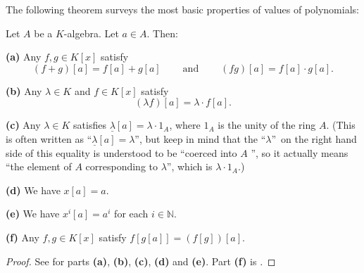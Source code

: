 The following theorem surveys the most basic properties of values of polynomials:

\begin{theorem}
\label{thm.pol.eval.a+b}Let $A$ be a $K$-algebra. Let $a\in A$. Then: \medskip

\textbf{(a)} Any $f,g\in K\left[  x\right]  $ satisfy%
\[
\left(  f+g\right)  \left[  a\right]  =f\left[  a\right]  +g\left[  a\right]
\ \ \ \ \ \ \ \ \ \ \text{and}\ \ \ \ \ \ \ \ \ \ \left(  fg\right)  \left[
a\right]  =f\left[  a\right]  \cdot g\left[  a\right]  .
\]


\textbf{(b)} Any $\lambda\in K$ and $f\in K\left[  x\right]  $ satisfy%
\[
\left(  \lambda f\right)  \left[  a\right]  =\lambda\cdot f\left[  a\right]
.
\]


\textbf{(c)} Any $\lambda\in K$ satisfies $\underline{\lambda}\left[
a\right]  =\lambda\cdot1_{A}$, where $1_{A}$ is the unity of the ring $A$.
(This is often written as \textquotedblleft$\underline{\lambda}\left[
a\right]  =\lambda$\textquotedblright, but keep in mind that the
\textquotedblleft$\lambda$\textquotedblright\ on the right hand side of this
equality is understood to be \textquotedblleft coerced into $A$%
\textquotedblright, so it actually means \textquotedblleft the element of $A$
corresponding to $\lambda$\textquotedblright, which is $\lambda\cdot1_{A}$.)
\medskip

\textbf{(d)} We have $x\left[  a\right]  =a$. \medskip

\textbf{(e)} We have $x^{i}\left[  a\right]  =a^{i}$ for each $i\in\mathbb{N}%
$. \medskip

\textbf{(f)} Any $f,g\in K\left[  x\right]  $ satisfy $f\left[  g\left[
a\right]  \right]  =\left(  f\left[  g\right]  \right)  \left[  a\right]  $.
\end{theorem}

\begin{proof}
See \cite[Theorem 7.6.3]{19s} for parts \textbf{(a)}, \textbf{(b)},
\textbf{(c)}, \textbf{(d)} and \textbf{(e)}. Part \textbf{(f)} is
\cite[Proposition 7.6.14]{19s}.
\end{proof}
